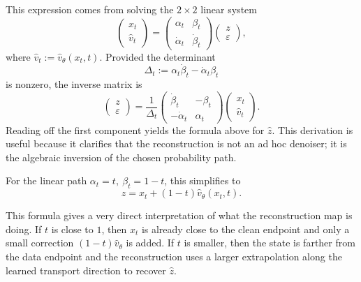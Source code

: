 \documentclass[11pt]{article}
\newcommand{\e}{\varepsilon}
\begin{document}
This expression comes from solving the \(2\times 2\) linear system
\begin{equation}
  \begin{pmatrix}
    x_t \\ \hat v_t
  \end{pmatrix}
  =
  \begin{pmatrix}
    \alpha_t & \beta_t \\
    \dot\alpha_t & \dot\beta_t
  \end{pmatrix}
  \begin{pmatrix}
    z \\ \e
  \end{pmatrix},
\end{equation}
where \(\hat v_t:=\hat v_\theta(x_t,t)\). Provided the determinant
\begin{equation}
  \Delta_t := \alpha_t\dot\beta_t - \dot\alpha_t\beta_t
\end{equation}
is nonzero, the inverse matrix is
\begin{equation}
  \begin{pmatrix}
    z \\ \e
  \end{pmatrix}
  =
  \frac{1}{\Delta_t}
  \begin{pmatrix}
    \dot\beta_t & -\beta_t \\
    -\dot\alpha_t & \alpha_t
  \end{pmatrix}
  \begin{pmatrix}
    x_t \\ \hat v_t
  \end{pmatrix}.
\end{equation}
Reading off the first component yields the formula above for \(\hat z\). This derivation is useful because it clarifies that the reconstruction is not an ad hoc denoiser; it is the algebraic inversion of the chosen probability path.

For the linear path \(\alpha_t=t,\ \beta_t=1-t\), this simplifies to
\begin{equation}
  \hat z = x_t + (1-t)\hat v_\theta(x_t,t).
\end{equation}

This formula gives a very direct interpretation of what the reconstruction map is doing. If \(t\) is close to \(1\), then \(x_t\) is already close to the clean endpoint and only a small correction \((1-t)\hat v_\theta\) is added. If \(t\) is smaller, then the state is farther from the data endpoint and the reconstruction uses a larger extrapolation along the learned transport direction to recover \(\hat z\).
\end{document}
